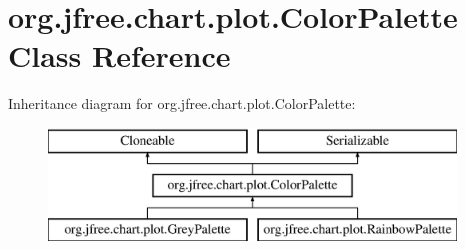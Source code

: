 \hypertarget{classorg_1_1jfree_1_1chart_1_1plot_1_1_color_palette}{}\section{org.\+jfree.\+chart.\+plot.\+Color\+Palette Class Reference}
\label{classorg_1_1jfree_1_1chart_1_1plot_1_1_color_palette}
Inheritance diagram for org.\+jfree.\+chart.\+plot.\+Color\+Palette\+:\begin{figure}[H]
\begin{center}
\leavevmode
\includegraphics[height=3.000000cm]{classorg_1_1jfree_1_1chart_1_1plot_1_1_color_palette}
\end{center}
\end{figure}
